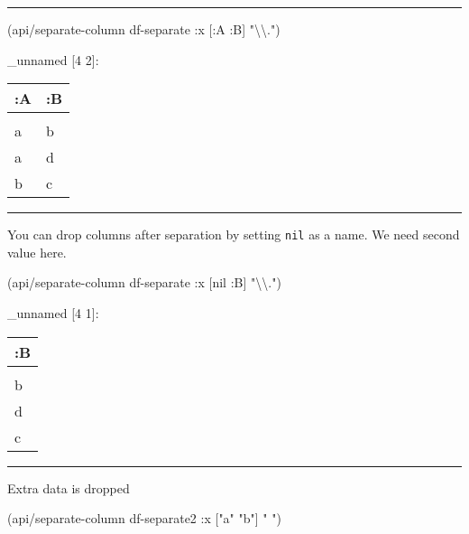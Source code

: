 \documentclass[]{article}
\newenvironment{Shaded}{\begin{snugshade}}{\end{snugshade}}
\newcommand{\StringTok}[1]{\textcolor[rgb]{0.31,0.60,0.02}{#1}}
\newcommand{\VariableTok}[1]{\textcolor[rgb]{0.00,0.00,0.00}{#1}}
\newcommand{\AttributeTok}[1]{\textcolor[rgb]{0.77,0.63,0.00}{#1}}
\newcommand{\NormalTok}[1]{#1}
\begin{document}
\begin{center}\rule{0.5\linewidth}{0.5pt}\end{center}

\begin{Shaded}
\begin{Highlighting}[]
\NormalTok{(api/separate-column df-separate }\AttributeTok{:x}\NormalTok{ [}\AttributeTok{:A} \AttributeTok{:B}\NormalTok{] }\StringTok{"}\NormalTok{\textbackslash{}\textbackslash{}}\StringTok{."}\NormalTok{)}
\end{Highlighting}
\end{Shaded}

\_unnamed {[}4 2{]}:

\begin{longtable}[]{@{}ll@{}}
\toprule
:A & :B\tabularnewline
\midrule
\endhead
&\tabularnewline
a & b\tabularnewline
a & d\tabularnewline
b & c\tabularnewline
\bottomrule
\end{longtable}

\begin{center}\rule{0.5\linewidth}{0.5pt}\end{center}

You can drop columns after separation by setting \texttt{nil} as a name.
We need second value here.

\begin{Shaded}
\begin{Highlighting}[]
\NormalTok{(api/separate-column df-separate }\AttributeTok{:x}\NormalTok{ [}\VariableTok{nil} \AttributeTok{:B}\NormalTok{] }\StringTok{"}\NormalTok{\textbackslash{}\textbackslash{}}\StringTok{."}\NormalTok{)}
\end{Highlighting}
\end{Shaded}

\_unnamed {[}4 1{]}:

\begin{longtable}[]{@{}l@{}}
\toprule
:B\tabularnewline
\midrule
\endhead
\tabularnewline
b\tabularnewline
d\tabularnewline
c\tabularnewline
\bottomrule
\end{longtable}

\begin{center}\rule{0.5\linewidth}{0.5pt}\end{center}

Extra data is dropped

\begin{Shaded}
\begin{Highlighting}[]
\NormalTok{(api/separate-column df-separate2 }\AttributeTok{:x}\NormalTok{ [}\StringTok{"a"} \StringTok{"b"}\NormalTok{] }\StringTok{" "}\NormalTok{)}
\end{Highlighting}
\end{Shaded}
\end{document}

